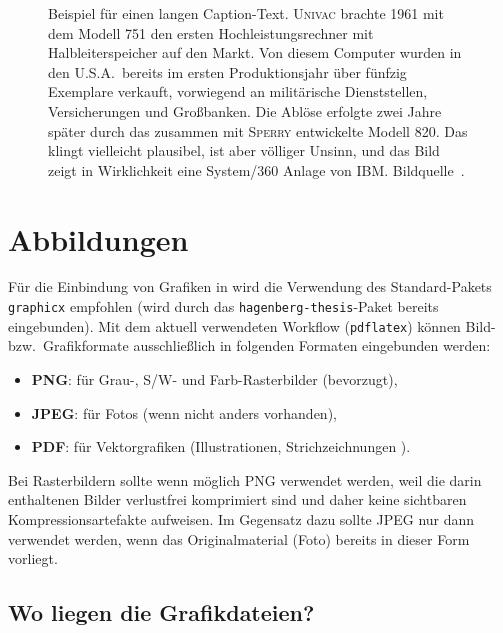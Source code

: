 \begin{figure}
\centering
{}  %
\caption{Beispiel für einen langen Caption-Text. \textsc{Univac}
brachte 1961 mit dem Modell 751 den ersten Hochleistungsrechner
mit Halbleiterspeicher auf den Markt. Von diesem Computer wurden
in den U.S.A.\ bereits im ersten Produktionsjahr über fünfzig
Exemplare verkauft, vorwiegend an militärische Dienststellen,
Versicherungen und Großbanken. Die Ablöse erfolgte zwei Jahre
später durch das zusammen mit \textsc{Sperry} entwickelte Modell 820.
Das klingt vielleicht plausibel, ist aber völliger Unsinn, und das
Bild zeigt in Wirklichkeit eine System/360 Anlage von IBM. 
Bildquelle~\cite{IBM360}.} 
\label{fig:ibm360}
\end{figure}





\section{Abbildungen}

Für die Einbindung von Grafiken in \latex wird die Verwendung des Stan\-dard-Pakets
\texttt{graphicx} \cite{Carlisle2020} empfohlen 
(wird durch das \texttt{hagenberg-thesis}-Paket bereits eingebunden). 
Mit dem aktuell verwendeten Workflow (\texttt{pdflatex})
können Bild- bzw.\ Grafikformate ausschließlich 
in folgenden Formaten eingebunden werden:
%
\begin{itemize}
	\item \textbf{PNG}: für Grau-, S/W- und Farb-Rasterbilder (bevorzugt),
	\item \textbf{JPEG}: für Fotos (wenn nicht anders vorhanden),
	\item \textbf{PDF}: für Vektorgrafiken (Illustrationen, Strichzeichnungen \etc).
\end{itemize}
%
Bei Rasterbildern sollte wenn möglich PNG verwendet werden, weil die darin 
enthaltenen Bilder verlustfrei komprimiert sind und daher keine sichtbaren Kompressionsartefakte
aufweisen. Im Gegensatz dazu sollte JPEG nur dann verwendet werden, wenn das Originalmaterial
(Foto) bereits in dieser Form vorliegt.


\subsection{Wo liegen die Grafikdateien?} 

